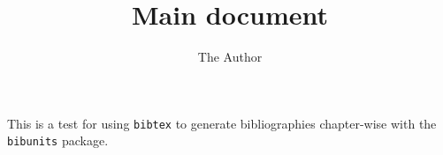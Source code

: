 \documentclass{report}
\begin{document}
\title{Main document}
\author{The Author}
\maketitle

This is a test for using \verb|bibtex| to generate bibliographies
chapter-wise with the \verb|bibunits| package.




\end{document}
